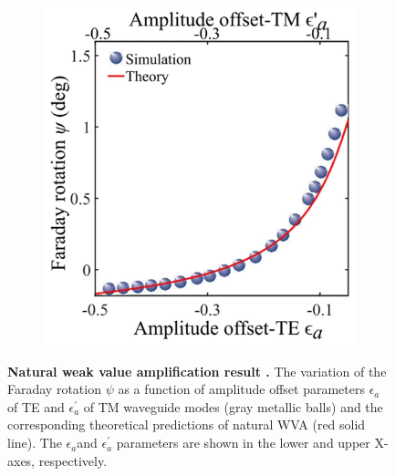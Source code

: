\documentclass[13pt]{article}
\begin{document}
\begin{figure}[hbt!]
	\centering
	\begin{subfigure}[]{.49\linewidth}
		\centering
		\includegraphics[width=\linewidth]{Figures/figure3a.png}
	\end{subfigure}
	\caption{\textbf{Natural weak value amplification result .} The variation of the Faraday rotation $\psi$ as a function of amplitude offset parameters $\epsilon_a$ of TE and $\epsilon^{'}_a$ of TM waveguide modes (gray metallic balls) and the corresponding theoretical predictions of natural WVA (red solid line). The $\epsilon_a$and $\epsilon^{'}_a$ parameters are shown in the lower and upper X-axes, respectively. }
	\label{fig:figure3}
\end{figure}
\end{document}

